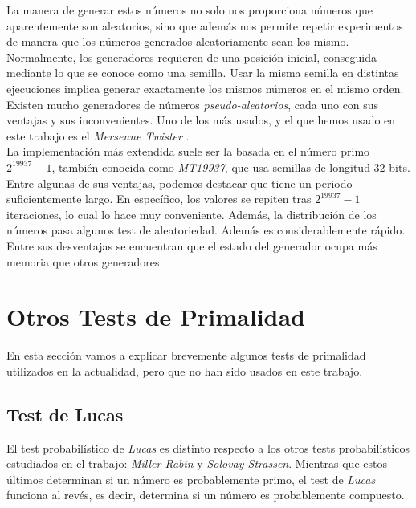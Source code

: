 La manera de generar estos números no solo nos proporciona números que aparentemente son aleatorios, sino que además nos permite repetir experimentos de manera que los números generados aleatoriamente sean los mismo.\\

Normalmente, los generadores requieren de una posición inicial, conseguida mediante lo que se conoce como una semilla. Usar la misma semilla en distintas ejecuciones implica generar exactamente los mismos números en el mismo orden.\\

Existen mucho generadores de números \textit{pseudo-aleatorios}, cada uno con sus ventajas y sus inconvenientes. Uno de los más usados, y el que hemos usado en este trabajo es el \textit{Mersenne Twister} \cite{matsumoto_nishimura_1998}.\\

La implementación más extendida suele ser la basada en el número primo $2^{19937}-1$, también conocida como \textit{MT19937}, que usa semillas de longitud $32$ bits. Entre algunas de sus ventajas, podemos destacar que tiene un periodo suficientemente largo. En específico, los valores se repiten tras $2^{19937}-1$ iteraciones, lo cual lo hace muy conveniente. Además, la distribución de los números pasa algunos test de aleatoriedad. Además es considerablemente rápido.\\

Entre sus desventajas se encuentran que el estado del generador ocupa más memoria que otros generadores.

\section{Otros Tests de Primalidad}

En esta sección vamos a explicar brevemente algunos tests de primalidad utilizados en la actualidad, pero que no han sido usados en este trabajo.

\subsection{Test de Lucas}

El test probabilístico de \textit{Lucas} es distinto respecto a los otros tests probabilísticos estudiados en el trabajo: \textit{Miller-Rabin} y \textit{Solovay-Strassen}. Mientras que estos últimos determinan si un número es probablemente primo, el test de \textit{Lucas} funciona al revés, es decir, determina si un número es probablemente compuesto.\\

